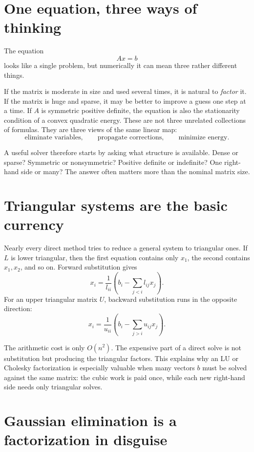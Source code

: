 
\section{One equation, three ways of thinking}

The equation
\[
  Ax=b
\]
looks like a single problem, but numerically it can mean three rather different things.

If the matrix is moderate in size and used several times, it is natural to \emph{factor} it.  If the matrix is huge and sparse, it may be better to improve a guess one step at a time.  If \(A\) is symmetric positive definite, the equation is also the stationarity condition of a convex quadratic energy.  These are not three unrelated collections of formulas.  They are three views of the same linear map:
\[
  \text{eliminate variables},\qquad
  \text{propagate corrections},\qquad
  \text{minimize energy}.
\]

A useful solver therefore starts by asking what structure is available.  Dense or sparse?  Symmetric or nonsymmetric?  Positive definite or indefinite?  One right-hand side or many?  The answer often matters more than the nominal matrix size.

\section{Triangular systems are the basic currency}

Nearly every direct method tries to reduce a general system to triangular ones.  If \(L\) is lower triangular, then the first equation contains only \(x_1\), the second contains \(x_1,x_2\), and so on.  Forward substitution gives
\[
  x_i=\frac{1}{l_{ii}}
  \left(b_i-\sum_{j<i}l_{ij}x_j\right).
\]
For an upper triangular matrix \(U\), backward substitution runs in the opposite direction:
\[
  x_i=\frac{1}{u_{ii}}
  \left(b_i-\sum_{j>i}u_{ij}x_j\right).
\]

The arithmetic cost is only \(O(n^2)\).  The expensive part of a direct solve is not substitution but producing the triangular factors.  This explains why an LU or Cholesky factorization is especially valuable when many vectors \(b\) must be solved against the same matrix: the cubic work is paid once, while each new right-hand side needs only triangular solves.

\section{Gaussian elimination is a factorization in disguise}

